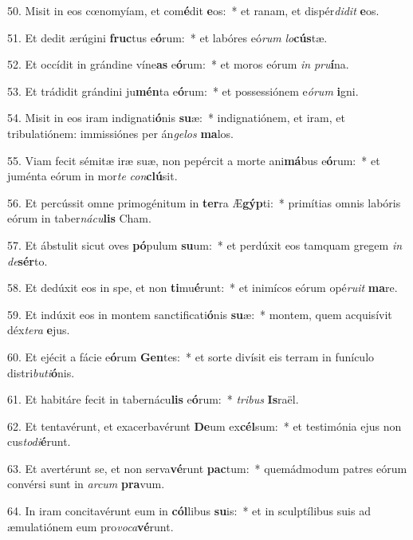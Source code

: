 50. Misit in eos cœnomyíam, et com\textbf{é}dit \textbf{e}os:~*  et ranam, et dispér\textit{di}\textit{dit} \textbf{e}os.\

51. Et dedit ærúgini \textbf{fruc}tus e\textbf{ó}rum:~*  et labóres eó\textit{rum} \textit{lo}\textbf{cús}tæ.\

52. Et occídit in grándine víne\textbf{as} e\textbf{ó}rum:~*  et moros eórum \textit{in} \textit{pru}\textbf{í}na.\

53. Et trádidit grándini ju\textbf{mén}ta e\textbf{ó}rum:~*  et possessiónem e\textit{ó}\textit{rum} \textbf{i}gni.\

54. Misit in eos iram indignati\textbf{ó}nis \textbf{su}æ:~*  indignatiónem, et iram, et tribulatiónem: immissiónes per án\textit{ge}\textit{los} \textbf{ma}los.\

55. Viam fecit sémitæ iræ suæ, non pepércit a morte ani\textbf{má}bus e\textbf{ó}rum:~*  et juménta eórum in mor\textit{te} \textit{con}\textbf{clú}sit.\

56. Et percússit omne primogénitum in \textbf{ter}ra Æ\textbf{gýp}ti:~*  primítias omnis labóris eórum in taber\textit{ná}\textit{cu}\textbf{lis} Cham.\

57. Et ábstulit sicut oves \textbf{pó}pulum \textbf{su}um:~*  et perdúxit eos tamquam gregem \textit{in} \textit{de}\textbf{sér}to.\

58. Et dedúxit eos in spe, et non \textbf{ti}mu\textbf{é}runt:~*  et inimícos eórum opé\textit{ru}\textit{it} \textbf{ma}re.\

59. Et indúxit eos in montem sanctificati\textbf{ó}nis \textbf{su}æ:~*  montem, quem acquisívit déx\textit{te}\textit{ra} \textbf{e}jus.\

60. Et ejécit a fácie e\textbf{ó}rum \textbf{Gen}tes:~*  et sorte divísit eis terram in funículo distri\textit{bu}\textit{ti}\textbf{ó}nis.\

61. Et habitáre fecit in tabernácu\textbf{lis} e\textbf{ó}rum:~*  \textit{tri}\textit{bus} \textbf{Is}raël.\

62. Et tentavérunt, et exacerbavérunt \textbf{De}um ex\textbf{cél}sum:~*  et testimónia ejus non cus\textit{to}\textit{di}\textbf{é}runt.\

63. Et avertérunt se, et non serva\textbf{vé}runt \textbf{pac}tum:~*  quemádmodum patres eórum convérsi sunt in \textit{ar}\textit{cum} \textbf{pra}vum.\

64. In iram concitavérunt eum in \textbf{cól}libus \textbf{su}is:~*  et in sculptílibus suis ad æmulatiónem eum pro\textit{vo}\textit{ca}\textbf{vé}runt.\

